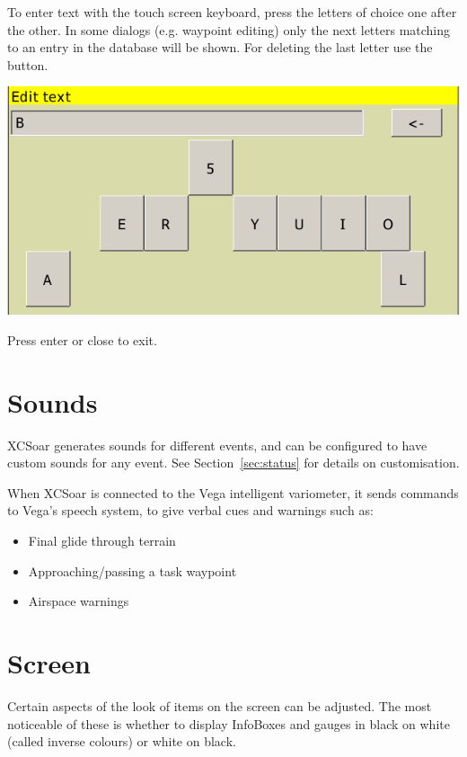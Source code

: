 \documentclass[a4paper,12pt]{refrep}
\newcommand{\InfoBox}[0]{{InfoBox}}
\begin{document}
To enter text with the touch screen keyboard, press the letters of choice one after the other. In some dialogs (e.g. waypoint editing) only the next letters matching to an entry in the database will be shown. For deleting the last letter use the \button{$<-$} button.

\begin{center}
\includegraphics[angle=0,width=\linewidth,keepaspectratio='true']{figures/textentry_keyboard.png}
\end{center}

Press enter or close to exit.

\section{Sounds}

XCSoar generates sounds for different events, and can be configured to
have custom sounds for any event.  See Section~\ref{sec:status} for
details on customisation.

When XCSoar is connected to the Vega intelligent variometer, it sends
commands to Vega's speech system, to give verbal cues and warnings such as:
\begin{itemize}
\item Final glide through terrain
\item Approaching/passing a task waypoint
\item Airspace warnings
\end{itemize}

\section{Screen}

Certain aspects of the look of items on the screen can be adjusted.
The most noticeable of these is whether to display {\InfoBox}es and
gauges in black on white (called inverse colours) or white on black.
\end{document}
